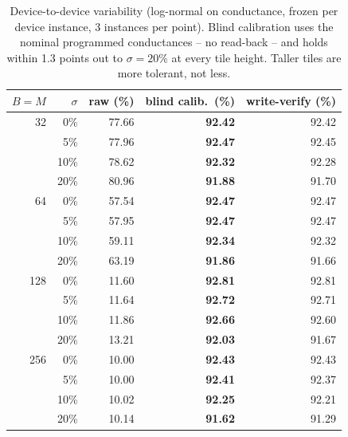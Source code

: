 \begin{table}[t]
\centering
\caption{Device-to-device variability (log-normal on conductance, frozen per device instance, 3 instances per point). Blind calibration uses the nominal programmed conductances -- no read-back -- and holds within 1.3 points out to $\sigma=20\%$ at every tile height. Taller tiles are more tolerant, not less.}
\label{tab:variability}
\begin{tabular}{rrrrr}
\toprule
$B{=}M$ & $\sigma$ & raw (\%) & blind calib.\ (\%) & write-verify (\%) \\
\midrule
32 & 0\% & 77.66 & \textbf{92.42} & 92.42 \\
 & 5\% & 77.96 & \textbf{92.47} & 92.45 \\
 & 10\% & 78.62 & \textbf{92.32} & 92.28 \\
 & 20\% & 80.96 & \textbf{91.88} & 91.70 \\
\midrule
64 & 0\% & 57.54 & \textbf{92.47} & 92.47 \\
 & 5\% & 57.95 & \textbf{92.47} & 92.47 \\
 & 10\% & 59.11 & \textbf{92.34} & 92.32 \\
 & 20\% & 63.19 & \textbf{91.86} & 91.66 \\
\midrule
128 & 0\% & 11.60 & \textbf{92.81} & 92.81 \\
 & 5\% & 11.64 & \textbf{92.72} & 92.71 \\
 & 10\% & 11.86 & \textbf{92.66} & 92.60 \\
 & 20\% & 13.21 & \textbf{92.03} & 91.67 \\
\midrule
256 & 0\% & 10.00 & \textbf{92.43} & 92.43 \\
 & 5\% & 10.00 & \textbf{92.41} & 92.37 \\
 & 10\% & 10.02 & \textbf{92.25} & 92.21 \\
 & 20\% & 10.14 & \textbf{91.62} & 91.29 \\
\bottomrule
\end{tabular}
\end{table}
